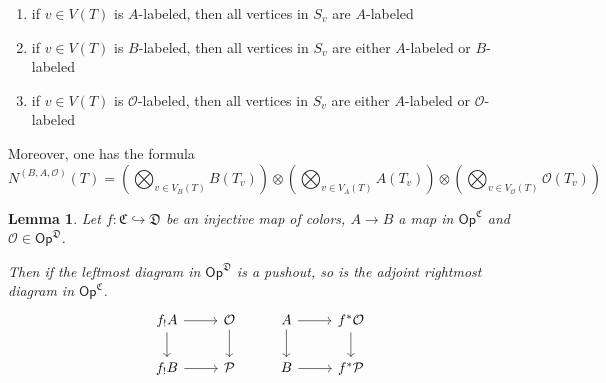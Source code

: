 \documentclass[a4paper,10pt
,draft
]{article}%
\numberwithin{equation}{section}
\numberwithin{figure}{section}
\newtheorem{lemma}[equation]{Lemma}%
\theoremstyle{definition} %
\newcommand{\1}{\ensuremath{\mathbbm 1}}%
\begin{document}
\begin{enumerate}[label=(\roman*)]
\item if $v \in V(T)$ is $A$-labeled, then all vertices in $S_{v}$ are $A$-labeled
\item if $v \in V(T)$ is $B$-labeled, then all vertices in $S_{v}$ are either $A$-labeled or $B$-labeled
\item if $v \in V(T)$ is $\mathcal{O}$-labeled, then all vertices in $S_{v}$ are either $A$-labeled or $\mathcal{O}$-labeled
\end{enumerate}
Moreover, one has the formula
\begin{equation}\label{NBAO EQ}
N^{(B,A,\mathcal{O})}(T) = 
\left(\bigotimes_{v \in V_B(T)} B(T_v) \right) \otimes
\left(\bigotimes_{v \in V_A(T)} A(T_v) \right) \otimes
\left(\bigotimes_{v \in V_{\mathcal{O}}(T)} \mathcal{O}(T_v) \right)
\end{equation}





\begin{lemma}\label{BASICPUSH LEMMA}
Let $f \colon \mathfrak{C} \hookrightarrow \mathfrak{D}$ be an injective map of colors, $A \to B$ a map in $\mathsf{Op}^{\mathfrak{C}}$
and $\mathcal{O} \in \mathsf{Op}^{\mathfrak{D}}$.

Then if the leftmost diagram in $\mathsf{Op}^{\mathfrak{D}}$ is a pushout, so is the adjoint rightmost diagram in $\mathsf{Op}^{\mathfrak{C}}$.
\[
\begin{tikzcd}
	f_! A \ar{r} \ar{d} & \mathcal{O} \ar{d}
&
	A \ar{r} \ar{d} & f^{\**} \mathcal{O} \ar{d}
\\
	f_! B \ar{r} & \mathcal{P}
&
	B \ar{r} & f^{\**} \mathcal{P}
\end{tikzcd}
\]
\end{lemma}
\end{document}

